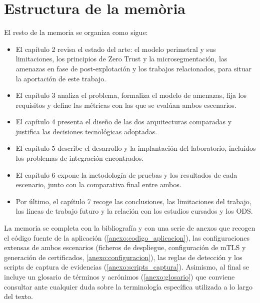 \documentclass[11pt,spanish,listoffigures,listoftables]{tfgetsinf}
\begin{document}
    \section{Estructura de la mem\`oria}
    El resto de la memoria se organiza como sigue:
    \begin{itemize}
        \item El capítulo 2 revisa el estado del arte: el modelo perimetral y sus limitaciones, los principios de Zero Trust y la microsegmentación, las amenazas en fase de post-explotación y los trabajos relacionados, para situar la aportación de este trabajo.
        \item El capítulo 3 analiza el problema, formaliza el modelo de amenazas, fija los requisitos y define las métricas con las que se evalúan ambos escenarios.
        \item El capítulo 4 presenta el diseño de las dos arquitecturas comparadas y justifica las decisiones tecnológicas adoptadas.
        \item El capítulo 5 describe el desarrollo y la implantación del laboratorio, incluidos los problemas de integración encontrados.
        \item El capítulo 6 expone la metodología de pruebas y los resultados de cada escenario, junto con la comparativa final entre ambos.
        \item Por último, el capítulo 7 recoge las conclusiones, las limitaciones del trabajo, las líneas de trabajo futuro y la relación con los estudios cursados y los ODS.
    \end{itemize}

    La memoria se completa con la bibliografía y con una serie de anexos que recogen el código fuente de la aplicación (\cref{anexo:codigo_aplicacion}), las configuraciones extensas de ambos escenarios (ficheros de despliegue, configuración de mTLS y generación de certificados, \cref{anexo:configuracion}), las reglas de detección y los scripts de captura de evidencias (\cref{anexo:scripts_captura}). Asimismo, al final se incluye un glosario de términos y acrónimos (\cref{anexo:glosario}) que conviene consultar ante cualquier duda sobre la terminología específica utilizada a lo largo del texto.



\end{document}
